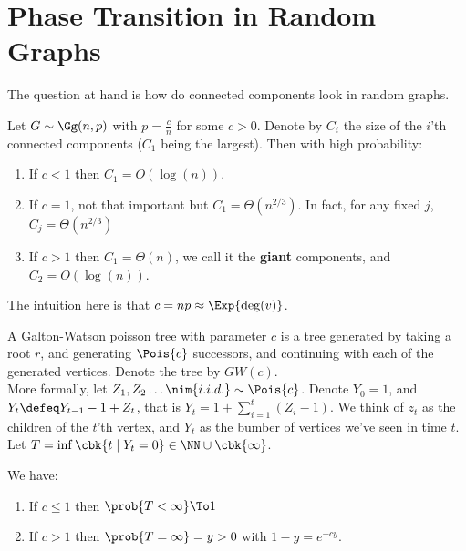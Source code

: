 \documentclass[a4paper, 11pt, oneside]{book}
\begin{document}
	\section{Phase Transition in Random Graphs}
	The question at hand is how do connected components look in random graphs.
	\begin{thm}
		 \label{thm: Erdos Renyi} Let $G\sim \Gg(n,p)$ with $p = \frac{c}{n}$ for some $c > 0$. Denote by $C_i$ the size of the $i$'th connected components ($C_1$ being the largest). Then with high probability:
		\begin{enumerate}
			\item If $c<1$ then $C_1 = O(\log(n))$.
			\item If $c=1$, not that important but $C_1 = \Theta(n^{2/3})$. In fact, for any fixed $j$, $C_j = \Theta(n^{2/3})$
			\item If $c>1$ then $C_1 = \Theta(n)$, we call it the \textbf{giant} components, and $C_2 = O(\log(n))$.
		\end{enumerate}
	\end{thm}
	\begin{remark}
		The intuition here is that $c = np \approx\Exp{\deg(v)}$.
	\end{remark}
	\begin{yellowBox}
	\begin{defn}
		A Galton-Watson poisson tree with parameter $c$ is a tree generated by taking a root $r$, and generating $\Pois{c}$ successors, and continuing with each of the generated vertices. Denote the tree by $GW(c)$.\\
		More formally, let $Z_1,Z_2\ldots \nim{i.i.d.}\sim \Pois{c}$. Denote $Y_0 = 1$, and $Y_t \defeq Y_{t-1} - 1 + Z_t$, that is $Y_t = 1 + \sum_{i=1}^t (Z_i-1)$. We think of $z_t$ as the children of the $t$'th vertex, and $Y_t$ as the bumber of vertices we've seen in time $t$. Let $T = \inf \cbk{t\mid Y_t = 0}\in \NN\cup \cbk{\infty}$. 
	\end{defn}	
	\end{yellowBox}
	\begin{thm}
		 \label{thm: Erdos Renyi reformulated}
		We have:
		\begin{enumerate}
			\item If $c \le 1$ then $\prob{T<\infty}\To 1$
			\item If $c > 1$ then $\prob{T=\infty} = y > 0$ with $1-y = e^{-cy}$.
		\end{enumerate}
	\end{thm}
\end{document}
